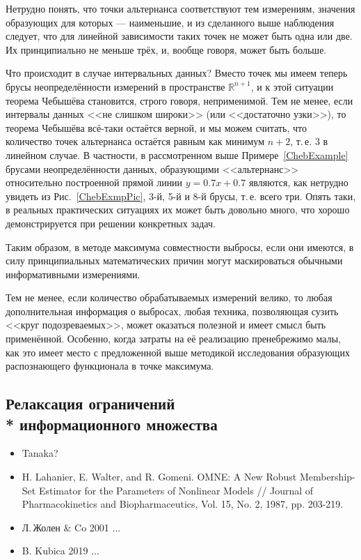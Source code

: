 \documentclass[a5paper,openany]{book}
\newcommand{\mbb}{\mathbb}
\begin{document}
Нетрудно понять, что точки альтернанса соответствуют тем измерениям, значения образующих 
для которых --- наименьшие, и из сделанного выше наблюдения следует, что для линейной 
зависимости таких точек не может быть одна или две. Их принципиально не меньше трёх, 
и, вообще говоря, может быть больше. 
  
Что происходит в случае интервальных данных? Вместо точек мы имеем теперь брусы 
неопределённости измерений в пространстве $\mbb{R}^{n+1}$, и к этой ситуации теорема 
Чебышёва становится, строго говоря, неприменимой. Тем не менее, если интервалы 
данных <<не слишком широки>> (или <<достаточно узки>>), то теорема Чебышёва всё-таки 
остаётся верной, и мы можем считать, что количество точек альтернанса остаётся 
равным как минимум $n+2$, т.\,е. $3$ в линейном случае. В частности, в рассмотренном 
выше Примере~\ref{ChebExample} брусами неопределённости данных, образующими 
<<альтернанс>> относительно построенной прямой линии $y = 0.7x + 0.7$ являются, 
как нетрудно увидеть из Рис.~\ref{ChebExmpPic}, 3-й, 5-й и 8-й брусы, т.\,е. всего 
три. Опять таки, в реальных практических ситуациях их может быть довольно много, 
что хорошо демонстрируется при решении конкретных задач. 
  
Таким образом, в методе максимума совместности выбросы, если они имеются, в силу 
принципиальных математических причин могут маскироваться обычными информативными 
измерениями. 
  
Тем не менее, если количество обрабатываемых измерений велико, то любая дополнительная 
информация о выбросах, любая техника, позволяющая сузить <<круг подозреваемых>>, может 
оказаться полезной и имеет смысл быть применённой. Особенно, когда затраты на её 
реализацию пренебрежимо малы, как это имеет место с предложенной выше методикой 
исследования образующих распознающего функционала в точке максимума. 
  

  
\subsection[Релаксация информационного множества]%
           {Релаксация ограничений \\*  информационного множества}   

\begin{itemize}
\item 
Tanaka? 
\item  
H. Lahanier, E. Walter, and R. Gomeni. OMNE: A New Robust Membership-Set Estimator for
the Parameters of Nonlinear Models // Journal of Pharmacokinetics and Biopharmaceutics, 
Vol. 15, No. 2, 1987, pp. 203-219. 
\item 
Л.\,Жолен \& Co 2001 ... \cite{ApplInteAnal}  
\item 
B. Kubica 2019 ... \cite{Kubica} 

\end{itemize}
  
\end{document}
